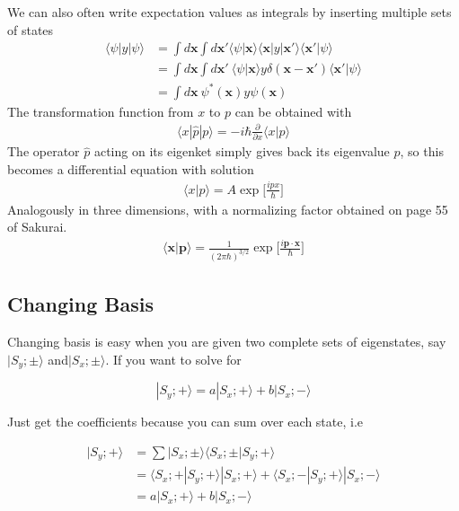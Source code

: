 We can also often write expectation values as integrals by inserting multiple sets of states
\begin{align}
\langle \psi | y |\psi\rangle &= \int d\textbf{x} \int d\textbf{x}'  \langle \psi | \textbf{x}\rangle \langle \textbf{x} |y|\textbf{x}'\rangle\langle \textbf{x}'|\psi\rangle\\
&= \int d\textbf{x} \int d\textbf{x}'~  \langle \psi | \textbf{x}\rangle y\delta(\textbf{x}-\textbf{x}')\langle \textbf{x}'|\psi\rangle\\
&= \int d\textbf{x}~\psi^*(\textbf{x}) y\psi(\textbf{x})
\end{align}
The transformation function from $x$ to $p$ can be obtained with
\begin{align}
\langle x |\hat{p}|p\rangle = -i\hbar\frac{\partial}{\partial x}\langle x|p\rangle
\end{align}
The operator $\hat{p}$ acting on its eigenket simply gives back its eigenvalue $p$, so this becomes a differential equation with solution
\begin{align}
\langle x | p \rangle = A\exp\Big[\frac{i p x}{\hbar}\Big]
\end{align}
Analogously in three dimensions, with a normalizing factor obtained on page 55 of Sakurai.
\begin{align}
\langle \textbf{x} |\textbf{p}\rangle = \frac{1}{(2\pi\hbar)^{3/2}}\exp\Big[\frac{i\textbf{p}\cdot\textbf{x}}{\hbar}\Big]
\end{align}



\subsection{Changing Basis}
Changing basis is easy when you are given two complete sets of eigenstates, say $|S_y;\pm\rangle$ and$|S_x;\pm\rangle$. If you want to solve for 

$$|S_y;+\rangle = a|S_x;+\rangle + b|S_x;-\rangle$$

Just get the coefficients because you can sum over each state, i.e

\begin{align}
|S_y;+\rangle &=\sum|S_x;\pm\rangle\langle S_x;\pm|S_y;+\rangle\\
&= \langle S_x;+|S_y;+\rangle |S_x;+\rangle + \langle S_x;-|S_y;+\rangle |S_x;-\rangle\\
&= a|S_x;+\rangle + b|S_x;-\rangle
\end{align}
